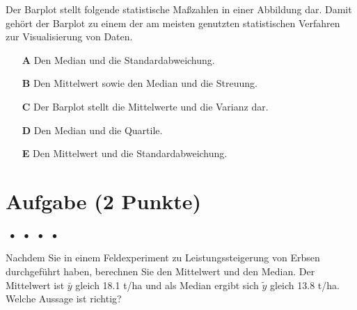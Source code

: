 \documentclass[a4paper, 9pt]{scrartcl}\usepackage[]{graphicx}\usepackage[]{xcolor}
\begin{document}
Der Barplot stellt folgende statistische Maßzahlen in einer Abbildung dar. Damit gehört der Barplot zu einem der am meisten genutzten statistischen Verfahren zur Visualisierung von Daten.

 



\begin{enumerate}
\item [\textbf{A} \msquare] Den Median und die Standardabweichung.
\item [\textbf{B} \msquare] Den Mittelwert sowie den Median und die Streuung.
\item [\textbf{C} \msquare] Der Barplot stellt die Mittelwerte und die Varianz dar.
\item [\textbf{D} \msquare] Den Median und die Quartile.
\item [\textbf{E} \msquare] Den Mittelwert und die Standardabweichung.
\end{enumerate} 

\section{Aufgabe \hfill (2 Punkte)}

\ifcollection
\begin{flushright}
\tiny\vspace{-2Ex}
\textbf{\examinhaltstart}
\exammodulemathstat $\;\bullet$
\exammodulestat $\;\bullet$
\exammodulestatbbv $\;\bullet$
\exammodulestatversuch $\;\bullet$
\exammodulebiostat
\vspace{-1Ex}
\end{flushright}
\fi




Nachdem Sie in einem Feldexperiment zu Leistungssteigerung von Erbsen durchgeführt haben, berechnen Sie den Mittelwert und den Median. Der Mittelwert ist $\bar{y}$ gleich 18.1 t/ha und als Median ergibt sich $\tilde{y}$ gleich 13.8 t/ha. Welche Aussage ist richtig?
\end{document}
